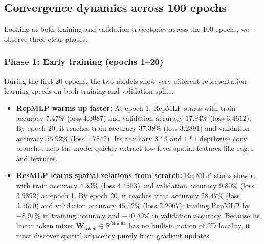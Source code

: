 \subsection{Convergence dynamics across 100 epochs}
Looking at both training and validation trajectories across the 100 epochs, we observe three clear phases:

\subsubsection{Phase 1: Early training (epochs 1--20)}
During the first 20 epochs, the two models show very different representation learning speeds on both training and validation splits:
\begin{itemize}[leftmargin=1.5em]
    \item \textbf{RepMLP warms up faster:} At epoch 1, RepMLP starts with train accuracy $7.47\%$ (loss $4.3087$) and validation accuracy $17.94\%$ (loss $3.4612$). By epoch 20, it reaches train accuracy $37.38\%$ (loss $3.2891$) and validation accuracy $55.92\%$ (loss $1.7842$). Its auxiliary $3 * 3$ and $1 * 1$ depthwise conv branches help the model quickly extract low-level spatial features like edges and textures.
    \item \textbf{ResMLP learns spatial relations from scratch:} ResMLP starts slower, with train accuracy $4.53\%$ (loss $4.4553$) and validation accuracy $9.80\%$ (loss $3.9892$) at epoch 1. By epoch 20, it reaches train accuracy $28.47\%$ (loss $3.5670$) and validation accuracy $45.52\%$ (loss $2.2067$), trailing RepMLP by \textbf{$-8.91\%$} in training accuracy and \textbf{$-10.40\%$} in validation accuracy. Because its linear token mixer $\mathbf{W}_{\text{token}} \in \mathbb{R}^{64 \times 64}$ has no built-in notion of 2D locality, it must discover spatial adjacency purely from gradient updates.
\end{itemize}

